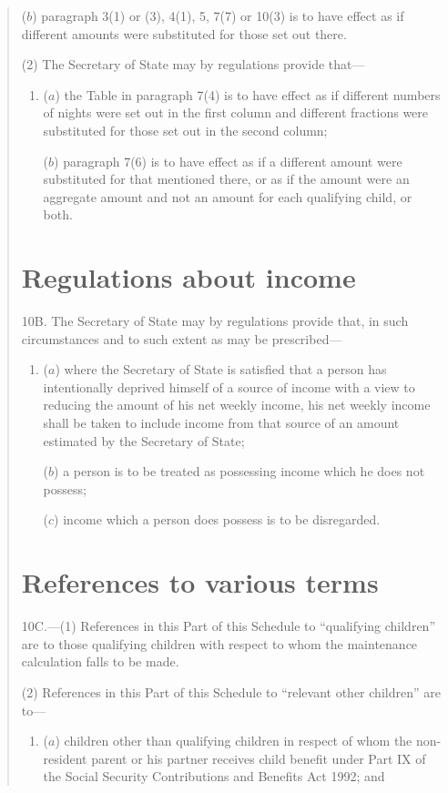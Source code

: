 \documentclass[12pt,a4paper]{article}
\begin{document}
\begin{quotation}
\begin{enumerate}
($b$) paragraph 3(1)  or (3), 4(1), 5, 7(7)  or 10(3)  is to have effect as if different amounts were substituted for those set out there.
\end{enumerate}

(2) The Secretary of State may by regulations provide that—
\begin{enumerate}\item[]
($a$) the Table in paragraph 7(4)  is to have effect as if different numbers of nights were set out in the first column and different fractions were substituted for those set out in the second column;

($b$) paragraph 7(6)  is to have effect as if a different amount were substituted for that mentioned there, or as if the amount were an aggregate amount and not an amount for each qualifying child, or both.
\end{enumerate}

\section*{Regulations about income}

10B. The Secretary of State may by regulations provide that, in such circumstances and to such extent as may be prescribed—
\begin{enumerate}\item[]
($a$) where the Secretary of State is satisfied that a person has intentionally deprived himself of a source of income with a view to reducing the amount of his net weekly income, his net weekly income shall be taken to include income from that source of an amount estimated by the Secretary of State;

($b$) a person is to be treated as possessing income which he does not possess;

($c$) income which a person does possess is to be disregarded.
\end{enumerate}

\section*{References to various terms}

10C.---(1) References in this Part of this Schedule to “qualifying children” are to those qualifying children with respect to whom the maintenance calculation falls to be made.

(2) References in this Part of this Schedule to “relevant other children” are to—
\begin{enumerate}\item[]
($a$) children other than qualifying children in respect of whom the non-resident parent or his partner receives child benefit under Part IX of the Social Security Contributions and Benefits Act 1992; and


\end{enumerate}
\end{quotation}
\end{document}
